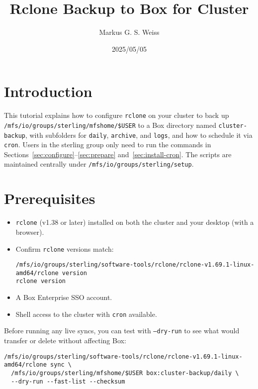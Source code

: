 \documentclass[12pt,letterpaper]{article}
\title{\LARGE Rclone Backup to Box for Cluster}
\author{Markus G. S. Weiss}
\date{2025/05/05}
\begin{document}
\maketitle

\tableofcontents
\newpage

\section{Introduction}
This tutorial explains how to configure \texttt{rclone} on your cluster to back up
\texttt{/mfs/io/groups/sterling/mfshome/\$USER} to a Box directory named \texttt{cluster-backup},
with subfolders for \texttt{daily}, \texttt{archive}, and \texttt{logs}, and how to
schedule it via \texttt{cron}. Users in the sterling group only need to run the commands in
Sections~\ref{sec:configure}--\ref{sec:prepare} and~\ref{sec:install-cron}. The scripts are
maintained centrally under \verb|/mfs/io/groups/sterling/setup|.

\section{Prerequisites}
\begin{itemize}
  \item \texttt{rclone} (v1.38 or later) installed on both the cluster and your desktop (with a browser).
  \item Confirm \texttt{rclone} versions match:
    \begin{lstlisting}[style=custombash]
/mfs/io/groups/sterling/software-tools/rclone/rclone-v1.69.1-linux-amd64/rclone version
rclone version
    \end{lstlisting}
  \item A Box Enterprise SSO account.
  \item Shell access to the cluster with \texttt{cron} available.
\end{itemize}

\begin{tcolorbox}[title=Tip]
Before running any live syncs, you can test with \texttt{--dry-run} to see what would transfer
or delete without affecting Box:
\begin{lstlisting}[style=custombash]
/mfs/io/groups/sterling/software-tools/rclone/rclone-v1.69.1-linux-amd64/rclone sync \
  /mfs/io/groups/sterling/mfshome/$USER box:cluster-backup/daily \
  --dry-run --fast-list --checksum
\end{lstlisting}
\end{tcolorbox}
\end{document}
